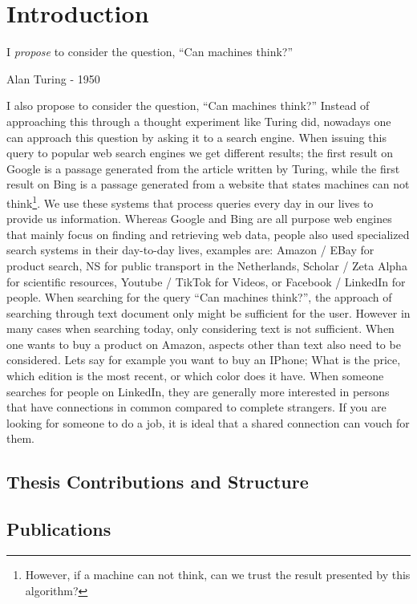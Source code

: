 \chapter{Introduction}
\epigraph{I \textit{propose} to consider the question, ``Can machines think?''}{Alan Turing - 1950}

I also propose to consider the question, ``Can machines think?'' Instead of approaching this through a thought experiment like Turing did, nowadays one can approach this question by asking it to a search engine. When issuing this query to popular web search engines we get different results; the first result on Google is a passage generated from the article written by Turing, while the first result on Bing is a passage generated from a website that states machines can not think\footnote{However, if a machine can not think, can we trust the result presented by this algorithm?}.
We use these systems that process queries every day in our lives to provide us information. Whereas Google and Bing are all purpose web engines that mainly focus on finding and retrieving web data, people also used specialized search systems in their day-to-day lives, examples are: Amazon / EBay for product search, NS for public transport in the Netherlands, Scholar / Zeta Alpha for scientific resources, Youtube / TikTok for Videos, or Facebook / LinkedIn for people.
When searching for the query ``Can machines think?'', the approach of searching through text document only might be sufficient for the user. However in many cases when searching today, only considering text is not sufficient. When one wants to buy a product on Amazon, aspects other than text also need to be considered. Lets say for example you want to buy an IPhone; What is the price, which edition is the most recent, or which color does it have. When someone searches for people on LinkedIn, they are generally more interested in persons that have connections in common compared to complete strangers. If you are looking for someone to do a job, it is ideal that a shared connection can vouch for them. 

\section{Thesis Contributions and Structure}

\section{Publications}